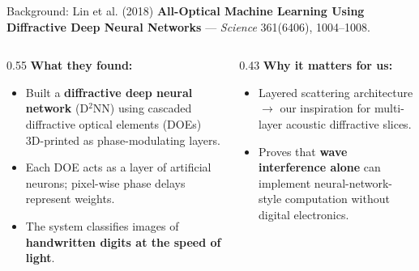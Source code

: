 \documentclass[aspectratio=169,11pt]{beamer}
\begin{document}
\begin{frame}{Background: Lin et al. (2018)}
  \textbf{All-Optical Machine Learning Using Diffractive Deep Neural Networks} — \textit{Science} 361(6406), 1004–1008.

  \vspace{0.2cm}
  \begin{columns}[T]
    \begin{column}{0.55\textwidth}
      \footnotesize
      \textbf{What they found:}
      \begin{itemize}
        \item Built a \textbf{diffractive deep neural network} (D$^2$NN) using cascaded diffractive optical elements (DOEs) 3D-printed as phase-modulating layers.
        \item Each DOE acts as a layer of artificial neurons; pixel-wise phase delays represent weights.
        \item The system classifies images of \textbf{handwritten digits at the speed of light}.
      \end{itemize}
    \end{column}
    \begin{column}{0.43\textwidth}
      \footnotesize
      \textbf{Why it matters for us:}
      \begin{itemize}
        \item Layered scattering architecture $\rightarrow$ our inspiration for multi-layer acoustic diffractive slices.
        \item Proves that \textbf{wave interference alone} can implement neural-network-style computation without digital electronics.
      \end{itemize}
    \end{column}
  \end{columns}
\end{frame}
\end{document}
